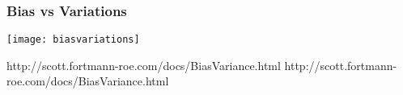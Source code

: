 \begin{frame}[fragile] \frametitle{Bias vs Variations}

\begin{center}
\texttt{[image: biasvariations]}
\end{center}
{\tiny http://scott.fortmann-roe.com/docs/BiasVariance.html }
%
%
{\tiny http://scott.fortmann-roe.com/docs/BiasVariance.html }
\end{frame}


